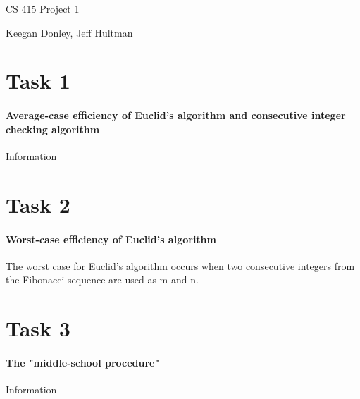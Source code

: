 \documentclass{report}
\begin{document}
	\begin{flushleft}
		\huge CS 415 Project 1
		
		\normalsize Keegan Donley, Jeff Hultman

		\section{Task 1}

		\paragraph{Average-case efficiency of Euclid's algorithm and consecutive integer checking algorithm}
		Information

		\section{Task 2}

		\paragraph{Worst-case efficiency of Euclid's algorithm}
		The worst case for Euclid's algorithm occurs when two consecutive integers from the Fibonacci sequence are used as m and n.  

		\section{Task 3}

		\paragraph{The "middle-school procedure"}
		Information

	\end{flushleft}
\end{document}

